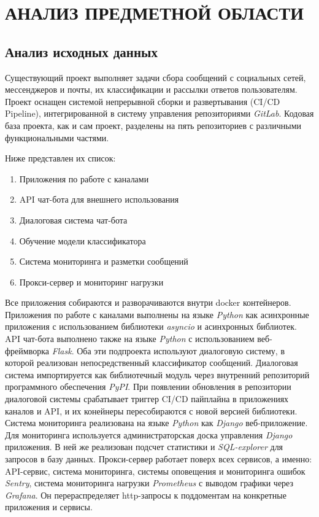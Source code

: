 \section{АНАЛИЗ ПРЕДМЕТНОЙ ОБЛАСТИ}
    \subsection{Анализ исходных данных}
    Существующий проект выполняет задачи сбора сообщений с социальных сетей, мессенджеров и почты,
    их классификации и рассылки ответов пользователям.
    Проект оснащен системой непрерывной сборки и развертывания (CI/CD Pipeline), интегрированной в
    систему управления репозиториями \textit{GitLab}.
    Кодовая база проекта, как и сам проект, разделены на пять репозиториев с различными
    функциональными частями.
    
    Ниже представлен их список:
    \begin{enumerate}
        \item Приложения по работе с каналами
        \item API чат-бота для внешнего использования
        \item Диалоговая система чат-бота
        \item Обучение модели классификатора
        \item Система мониторинга и разметки сообщений
        \item Прокси-сервер и мониторинг нагрузки
    \end{enumerate}
    
    Все приложения собираются и разворачиваются внутри docker контейнеров.
    Приложения по работе с каналами выполнены на языке \textit{Python} как асинхронные приложения
    с использованием библиотеки \textit{asyncio} и асинхронных библиотек.
    API чат-бота выполнено также на языке \textit{Python} с использованием веб-фреймворка \textit{Flask}.
    Оба эти подпроекта используют диалоговую систему, в которой реализован непосредственный
    классификатор сообщений.
    Диалоговая система импортируется как библиотечный модуль через внутренний репозиторий
    программного обеспечения \textit{PyPI}.
    При появлении обновления в репозитории диалоговой системы срабатывает триггер CI/CD пайплайна
    в приложениях каналов и API, и их конейнеры пересобираются с новой версией библиотеки.
    Система мониторинга реализована на языке \textit{Python} как \textit{Django} веб-приложение.
    Для мониторинга используется администраторская доска управления \textit{Django} приложения.
    В ней же реализован подсчет статистики и \textit{SQL-explorer} для запросов в базу данных.
    Прокси-сервер работает поверх всех сервисов, а именно: API-сервис, система мониторинга,
    системы оповещения и мониторинга ошибок \textit{Sentry}, система мониторинга нагрузки \textit{Prometheus}
    с выводом графики через \textit{Grafana}. Он перераспределяет http-запросы к поддоментам на конкретные
    приложения и сервисы.

